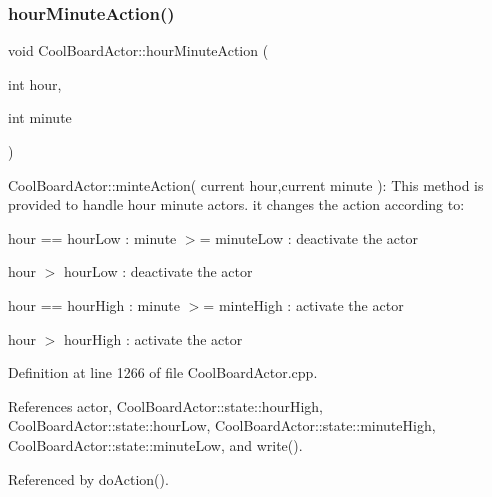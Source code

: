 \subsubsection{\texorpdfstring{hour\+Minute\+Action()}{hourMinuteAction()}}
{\footnotesize\ttfamily void Cool\+Board\+Actor\+::hour\+Minute\+Action (\begin{DoxyParamCaption}\item[{int}]{hour,  }\item[{int}]{minute }\end{DoxyParamCaption})}

Cool\+Board\+Actor\+::minte\+Action( current hour,current minute )\+: This method is provided to handle hour minute actors. it changes the action according to\+:

hour == hour\+Low \+: minute $>$= minute\+Low \+: deactivate the actor

hour $>$ hour\+Low \+: deactivate the actor

hour == hour\+High \+: minute $>$= minte\+High \+: activate the actor

hour $>$ hour\+High \+: activate the actor 

Definition at line 1266 of file Cool\+Board\+Actor.\+cpp.



References actor, Cool\+Board\+Actor\+::state\+::hour\+High, Cool\+Board\+Actor\+::state\+::hour\+Low, Cool\+Board\+Actor\+::state\+::minute\+High, Cool\+Board\+Actor\+::state\+::minute\+Low, and write().



Referenced by do\+Action().

